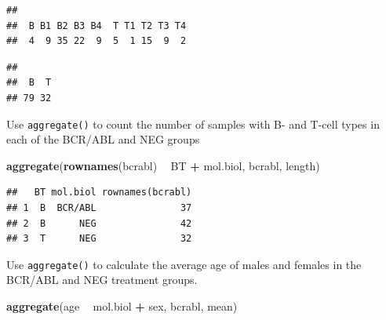 \documentclass[]{article}
\newenvironment{Shaded}{\begin{snugshade}}{\end{snugshade}}
\newcommand{\KeywordTok}[1]{\textcolor[rgb]{0.13,0.29,0.53}{\textbf{#1}}}
\newcommand{\DecValTok}[1]{\textcolor[rgb]{0.00,0.00,0.81}{#1}}
\newcommand{\StringTok}[1]{\textcolor[rgb]{0.31,0.60,0.02}{#1}}
\newcommand{\OperatorTok}[1]{\textcolor[rgb]{0.81,0.36,0.00}{\textbf{#1}}}
\newcommand{\NormalTok}[1]{#1}
\theoremstyle{definition}
\theoremstyle{definition}
\theoremstyle{remark}
\begin{document}
\begin{Shaded}
\end{Shaded}

\begin{verbatim}
## 
##  B B1 B2 B3 B4  T T1 T2 T3 T4 
##  4  9 35 22  9  5  1 15  9  2
\end{verbatim}

\begin{Shaded}
\end{Shaded}

\begin{verbatim}
## 
##  B  T 
## 79 32
\end{verbatim}

Use \texttt{aggregate()} to count the number of samples with B- and
T-cell types in each of the BCR/ABL and NEG groups

\begin{Shaded}
\begin{Highlighting}[]
\KeywordTok{aggregate}\NormalTok{(}\KeywordTok{rownames}\NormalTok{(bcrabl) }\OperatorTok{~}\StringTok{ }\NormalTok{BT }\OperatorTok{+}\StringTok{ }\NormalTok{mol.biol, bcrabl, length)}
\end{Highlighting}
\end{Shaded}

\begin{verbatim}
##   BT mol.biol rownames(bcrabl)
## 1  B  BCR/ABL               37
## 2  B      NEG               42
## 3  T      NEG               32
\end{verbatim}

Use \texttt{aggregate()} to calculate the average age of males and
females in the BCR/ABL and NEG treatment groups.

\begin{Shaded}
\begin{Highlighting}[]
\KeywordTok{aggregate}\NormalTok{(age }\OperatorTok{~}\StringTok{ }\NormalTok{mol.biol }\OperatorTok{+}\StringTok{ }\NormalTok{sex, bcrabl, mean)}
\end{Highlighting}
\end{Shaded}
\end{document}
